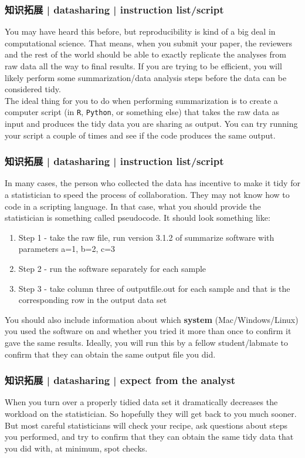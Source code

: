 \begin{frame}[fragile]
  \frametitle{知识拓展 | datasharing | instruction list/script}
  You may have heard this before, but reproducibility is kind of a big deal in computational science. That means, when you submit your paper, the reviewers and the rest of the world should be able to exactly replicate the analyses from raw data all the way to final results. If you are trying to be efficient, you will likely perform some summarization/data analysis steps before the data can be considered tidy.\\
  \vspace{1em}
  The ideal thing for you to do when performing summarization is to create a computer script (in \verb|R|, \verb|Python|, or something else) that takes the raw data as input and produces the tidy data you are sharing as output. You can try running your script a couple of times and see if the code produces the same output. 
\end{frame}

\begin{frame}
  \frametitle{知识拓展 | datasharing | instruction list/script}
  In many cases, the person who collected the data has incentive to make it tidy for a statistician to speed the process of collaboration. They may not know how to code in a scripting language. In that case, what you should provide the statistician is something called pseudocode. It should look something like:
  \begin{enumerate}
    \item Step 1 - take the raw file, run version 3.1.2 of summarize software with parameters a=1, b=2, c=3
    \item Step 2 - run the software separately for each sample
    \item Step 3 - take column three of outputfile.out for each sample and that is the corresponding row in the output data set
  \end{enumerate}

  You should also include information about which \textbf{system} (Mac/Windows/Linux) you used the software on and whether you tried it more than once to confirm it gave the same results. Ideally, you will run this by a fellow student/labmate to confirm that they can obtain the same output file you did. 
\end{frame}

\begin{frame}
  \frametitle{知识拓展 | datasharing | expect from the analyst}
  When you turn over a properly tidied data set it dramatically decreases the workload on the statistician. So hopefully they will get back to you much sooner. But most careful statisticians will check your recipe, ask questions about steps you performed, and try to confirm that they can obtain the same tidy data that you did with, at minimum, spot checks.
\end{frame}

